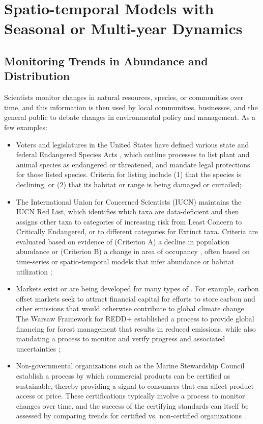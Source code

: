 \chapter{Spatio-temporal Models with Seasonal or Multi-year Dynamics} \label{Chap:spatiotemporal}

\section{Monitoring Trends in Abundance and Distribution}

Scientists monitor changes in natural resources, species, or communities over time, and this information is then used by local communities, businesses, and the general public to debate changes in environmental policy and management.  As a few examples:
\begin{itemize}
    \item Voters and legislatures in the United States have defined various state and federal Endangered Species Acts \cite{goble_local_1999}, which outline processes to list plant and animal species as endangered or threatened, and mandate legal protections for those listed species. Criteria for listing include (1) that the species is declining, or (2) that its habitat or range is being damaged or curtailed;

    \item The International Union for Concerned Scientists (IUCN) maintains the IUCN Red List, which identifies which taxa are data-deficient and then assigns other taxa to categories of increasing risk from Least Concern to Critically Endangered, or to different categories for Extinct taxa.  Criteria are evaluated based on evidence of (Criterion A) a decline in population abundance or (Criterion B) a change in area of occupancy \cite{iucn_standards_and_petitions_subcommittee_guidelines_2022}, often based on time-series or spatio-temporal models that infer abundance or habitat utilization \cite{sherley_estimating_2020}; 

    \item Markets exist or are being developed for many types of .  For example, carbon offset markets seek to attract financial capital for efforts to store carbon and other emissions that would otherwise contribute to global climate change.  The Warsaw Framework for REDD+ established a process to provide global financing for forest management that results in reduced emissions, while also mandating a process to monitor and verify progress and associated uncertainties \cite{pelletier_redd_2013}; 

    \item Non-governmental organizations such as the Marine Stewardship Council establish a process by which commercial products can be certified as sustainable, thereby providing a signal to consumers that can affect product access or price.  These certifications typically involve a process to monitor changes over time, and the success of the certifying standards can itself be assessed by comparing trends for certified vs. non-certified organizations \cite{gutierrez_eco-label_2012}.
\end{itemize}
